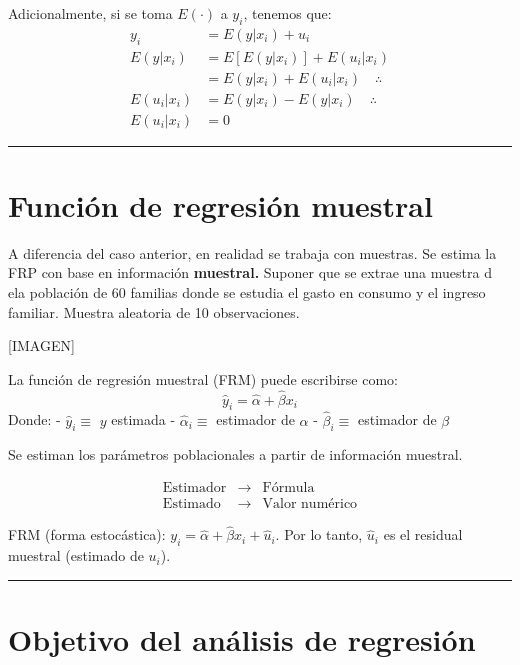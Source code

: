\documentclass[
]{book}
\begin{document}
Adicionalmente, si se toma \(E(\cdot)\) a \(y_i\), tenemos que:
\[
\begin{aligned}
y_i &= E(y|x_i) + u_i \\
E(y|x_i) &= E[E(y|x_i)] + E(u_i|x_i) \\
&= E(y|x_i) + E(u_i|x_i) \quad \therefore \\
E(u_i|x_i) &= E(y|x_i) - E(y|x_i) \quad \therefore \\
E(u_i|x_i) &= 0
\end{aligned}
\]

\begin{center}\rule{0.5\linewidth}{0.5pt}\end{center}

\hypertarget{funciuxf3n-de-regresiuxf3n-muestral}{%
\section{Función de regresión muestral}\label{funciuxf3n-de-regresiuxf3n-muestral}}

A diferencia del caso anterior, en realidad se trabaja con muestras. Se estima la FRP con base en información \textbf{muestral.}
Suponer que se extrae una muestra d ela población de 60 familias donde se estudia el gasto en consumo y el ingreso familiar.
Muestra aleatoria de 10 observaciones.

{[}IMAGEN{]}

La función de regresión muestral (FRM) puede escribirse como:
\[
\hat y_i = \hat \alpha + \hat \beta x_i 
\]
Donde:
- \(\hat y_i \equiv\) \(y\) estimada
- \(\hat \alpha_i \equiv\) estimador de \(\alpha\)
- \(\hat \beta_i \equiv\) estimador de \(\beta\)

Se estiman los parámetros poblacionales a partir de información muestral.

\[
\begin{array}{ccc}
\text{Estimador} & \rightarrow & \text{Fórmula} \\
\text{Estimado} & \rightarrow & \text{Valor numérico}
\end{array}
\]

FRM (forma estocástica): \(y_i = \hat \alpha + \hat \beta x_i + \hat u_i\). Por lo tanto, \(\hat u_i\) es el residual muestral (estimado de \(u_i\)).

\begin{center}\rule{0.5\linewidth}{0.5pt}\end{center}

\hypertarget{objetivo-del-anuxe1lisis-de-regresiuxf3n}{%
\section{Objetivo del análisis de regresión}\label{objetivo-del-anuxe1lisis-de-regresiuxf3n}}
\end{document}
